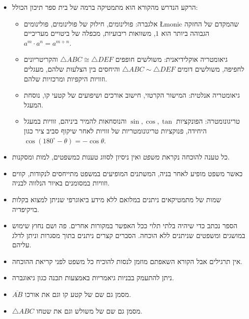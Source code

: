 \begin{itemize}
\item
הרקע הנדרש מהקורא הוא מתמטיקה ברמה של בית ספר תיכון הכולל:

\begin{itemize}
\item
אלגברה: פולינומים, חילוק של פולינומים, פולינומים 
\L{monic}
שהמקדם של החזקה הגבוהה ביותר הוא $1$, משוואות ריבועיות, מכפלה של ביטויים מעריכיים 
$a^m\cdot a^n=a^{m+n}$.

\item
גיאומטריה אוקלידיאנית: משולשים חופפים 
$\triangle ABC \cong \triangle DEF$
והקריטריונים לחפיפה, משולשים דומים
$\triangle ABC \sim \triangle DEF$
והיחסים בין הצלעות שלהם, מעגלים וזוויות היקפיות ומרכזיות שלהם.

\item
גיאומטריה אנלטית: המישור הקרטזי, חישוב אורכים ושיפועים של קטעי קו, נוסחת המעגל.

\item
טריגונומטרה: הפונקציות 
$\sin,\cos,\tan$
והנוסחאות להמיר ביניהם, זוויות במעגל היחידה, פנוקציות טריגונומטריות של זוויות לאחר שיקוף סביב ציר כגון
$\cos (180^\circ-\theta)=-\cos\theta$.
\end{itemize}

\item
כל טענה להוכחה נקראת 
\emph{משפט}
ואין ניסיון לסווג טענות כמשפטים, למות ומסקנות.

\item
כאשר משפט מופיע לאחר בניה, המשתנים המופיעים במשפט מתייחסים לנקודות, קווים וזוויות במסומנים באיור הנלווה לבניה.

\item
שמות של מתמטיקאים ניתנים במלואם ללא מידע ביאוגרפי שניתן למצוא בקלות בויקיפדיה.

\item
הספר נכתב כדי שיהיה בלתי תלוי ככל האפשר במקורות אחרים. פה ושם נחוץ שימוש במושגים ומשפטים שניתנים ללא הוכחה. הסברים קצרים ניתנים בתוך מסגרות וניתן לדלג עליהם.

\item
אין תרגילים אבל הקורא השאפתם מוזמן לנסות להוכיח כל משפט לפני קריאת ההוכחה.

\item
ניתן להתעמק בבניות גיאמריות באמצעות תכנה כגון גיאוגברה.

\item
$\overline{AB}$
מסמן גם שם של קטע קו וגם את אורכו.

\item
$\triangle ABC$
מסמן גם שם של משולש וגם את שטחו.
\end{itemize}

